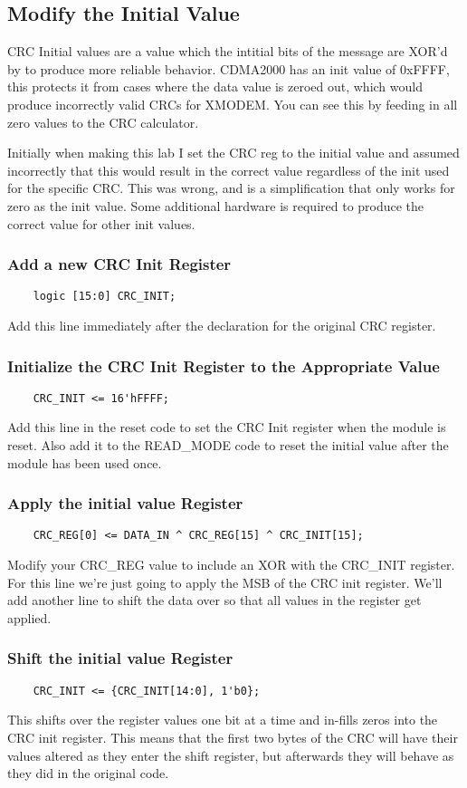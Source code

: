 \subsection{Modify the Initial Value}
CRC Initial values are a value which the intitial bits of the message are XOR'd by to produce more reliable behavior. CDMA2000 has an init value of 0xFFFF, this protects it from cases where the data value is zeroed out, which would produce incorrectly valid CRCs for XMODEM. You can see this by feeding in all zero values to the CRC calculator.

Initially when making this lab I set the CRC reg to the initial value and assumed incorrectly that this would result in the correct value regardless of the init used for the specific CRC. This was wrong, and is a simplification that only works for zero as the init value. Some additional hardware is required to produce the correct value for other init values. 

\subsubsection{Add a new CRC Init Register}
\begin{verbatim}
    logic [15:0] CRC_INIT;
\end{verbatim}
Add this line immediately after the declaration for the original CRC register. 

\subsubsection{Initialize the CRC Init Register to the Appropriate Value}
\begin{verbatim}
    CRC_INIT <= 16'hFFFF;
\end{verbatim}
Add this line in the reset code to set the CRC Init register when the module is reset. Also add it to the READ\_MODE code to reset the initial value after the module has been used once. 

\subsubsection{Apply the initial value Register}
\begin{verbatim}
    CRC_REG[0] <= DATA_IN ^ CRC_REG[15] ^ CRC_INIT[15];
\end{verbatim}
Modify your CRC\_REG value to include an XOR with the CRC\_INIT register. For this line we're just going to apply the MSB of the CRC init register. We'll add another line to shift the data over so that all values in the register get applied.

\subsubsection{Shift the initial value Register}
\begin{verbatim}
    CRC_INIT <= {CRC_INIT[14:0], 1'b0}; 
\end{verbatim}
This shifts over the register values one bit at a time and in-fills zeros into the CRC init register. This means that the first two bytes of the CRC will have their values altered as they enter the shift register, but afterwards they will behave as they did in the original code. 